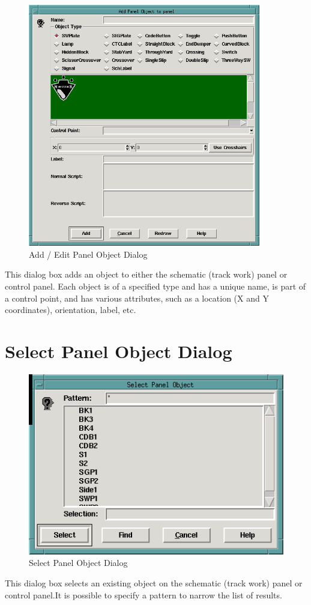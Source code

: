 \begin{figure}[hbpt]
\begin{centering}
\includegraphics[width=4in]{DISPAddEditPanelObject.png}
\caption{Add / Edit Panel Object Dialog}
\label{fig:dispatcher:addeditpaneldialog}
\end{centering}
\end{figure}
%
This dialog box adds an object to either the schematic (track work)
panel or control panel.  Each object is of a specified type and has a
unique name, is part of a control point, and has various attributes,
such as a location (X and Y coordinates), orientation, label, etc.

\section{Select Panel Object Dialog}

\begin{figure}[hbpt]
\begin{centering}
\includegraphics{DISPSelectPanelObject.png}
\caption{Select Panel Object Dialog}
\label{fig:dispatcher:selectpanelobjectdialog}
\end{centering}
\end{figure}
%
This dialog box selects an existing object on the schematic (track work)
panel or control panel.It is possible to specify a pattern to narrow
the list of results.

